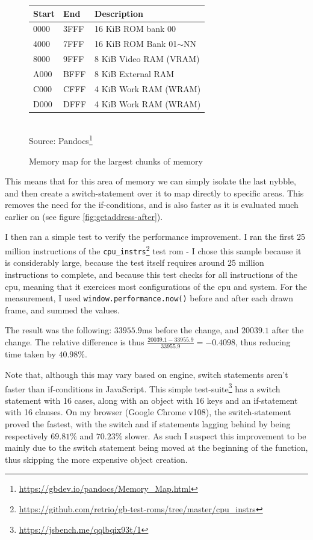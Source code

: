 \documentclass[11pt]{report}
\newcommand{\ftnt}[1]{\footnote{\url{#1}}}
\begin{document}
\begin{figure}[h]
    \centering
    \begin{tabular}{|l|l|l|}
    \hline
    \textbf{Start} & \textbf{End} & \textbf{Description} \\ \hline
    0000 & 3FFF & 16 KiB ROM bank 00 \\ \hline
    4000 & 7FFF & 16 KiB ROM Bank 01$\sim$NN \\ \hline
    8000 & 9FFF & 8 KiB Video RAM (VRAM) \\ \hline
    A000 & BFFF & 8 KiB External RAM \\ \hline
    C000 & CFFF & 4 KiB Work RAM (WRAM) \\ \hline
    D000 & DFFF & 4 KiB Work RAM (WRAM) \\ \hline
    \end{tabular}\\
    Source: Pandocs\ftnt{https://gbdev.io/pandocs/Memory_Map.html}
    \caption{Memory map for the largest chunks of memory}
    \label{fig:memory-map-largest}
\end{figure}

This means that for this area of memory we can simply isolate the last nybble, and then create a switch-statement over it to map directly to specific areas. This removes the need for the if-conditions, and is also faster as it is evaluated much earlier on (see figure \ref{fig:getaddress-after}).

I then ran a simple test to verify the performance improvement. I ran the first 25 million instructions of the \texttt{cpu\_instrs}\ftnt{https://github.com/retrio/gb-test-roms/tree/master/cpu_instrs} test \gls{rom} - I chose this sample because it is considerably large, because the test itself requires around 25 million instructions to complete, and because this test checks for all instructions of the \gls{cpu}, meaning that it exercices most configurations of the \gls{cpu} and system. For the measurement, I used \texttt{window.performance.now()} before and after each drawn frame, and summed the values.

The result was the following: $33 955.9$ms before the change, and $20 039.1$ after the change. The relative difference is thus $\frac{20 039.1-33 955.9}{33 955.9}=-0.4098$, thus reducing time taken by $40.98\%$.

Note that, although this may vary based on engine, switch statements aren't faster than if-conditions in JavaScript. This simple test-suite\ftnt{https://jsbench.me/qqlbqix93t/1} has a switch statement with 16 cases, along with an object with 16 keys and an if-statement with 16 clauses. On my browser (Google Chrome v108), the switch-statement proved the fastest, with the switch and if statements lagging behind by being respectively $69.81\%$ and $70.23\%$ slower. As such I suspect this improvement to be mainly due to the switch statement being moved at the beginning of the function, thus skipping the more expensive object creation.
\end{document}
